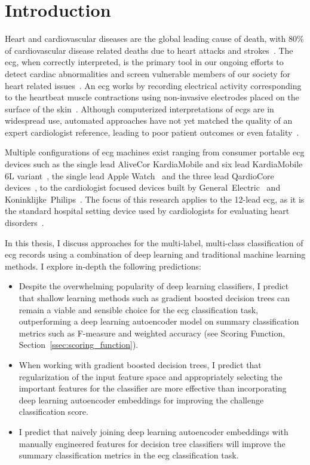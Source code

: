 \documentclass[\main/thesis.tex]{subfiles}
\begin{document}
\chapter{Introduction}

Heart and cardiovascular diseases are the global leading cause of death, with 80\% of cardiovascular disease related deaths due to heart attacks and strokes~\cite{doi:10.1161/CIR.0000000000000757}.
The \acrfull{ecg}, when correctly interpreted, is the primary tool in our ongoing efforts to detect cardiac abnormalities and screen vulnerable members of our society for heart related issues~\cite{SMULYAN2019153}.
An \gls{ecg} works by recording electrical activity corresponding to the heartbeat muscle contractions using non-invasive electrodes placed on the surface of the skin~\cite{bonow2011braunwald}.
Although computerized interpretations of \gls{ecg}s are in widespread use, automated approaches have not yet matched the quality of an expert cardiologist reference, leading to poor patient outcomes or even fatality~\cite{BREEN2019}.

Multiple configurations of \gls{ecg} machines exist ranging from consumer portable \gls{ecg} devices such as the single lead AliveCor KardiaMobile and six lead KardiaMobile 6L variant~\cite{alivecor-website}, the single lead Apple Watch~\cite{apple-watch} and the three lead QardioCore devices~\cite{quardiocore-website}, to the cardiologist focused devices built by General~Electric~\cite{generalelectric-website} and Koninklijke~Philips~\cite{koninklijkephilips-website}.
The focus of this research applies to the 12-lead \gls{ecg}, as it is the standard hospital setting device used by cardiologists for evaluating heart disorders~\cite{kligfield_paul_recommendations_2007}.

In this thesis, I discuss approaches for the multi-label, multi-class classification of \gls{ecg} records using a combination of deep learning and traditional machine learning methods.
I explore in-depth the following predictions:
\begin{itemize}
    \item Despite the overwhelming popularity of deep learning classifiers, I predict that shallow learning methods such as gradient boosted decision trees can remain a viable and sensible choice for the \gls{ecg} classification task, outperforming a deep learning autoencoder model on summary classification metrics such as F-measure and weighted accuracy (see Scoring Function, Section~\ref{ssec:scoring_function}).
    \item When working with gradient boosted decision trees, I predict that regularization of the input feature space and appropriately selecting the important features for the classifier are more effective than incorporating deep learning autoencoder embeddings for improving the challenge classification score.
    \item I predict that naively joining deep learning autoencoder embeddings with manually engineered features for decision tree classifiers will improve the summary classification metrics in the \gls{ecg} classification task.
\end{itemize}
\end{document}
